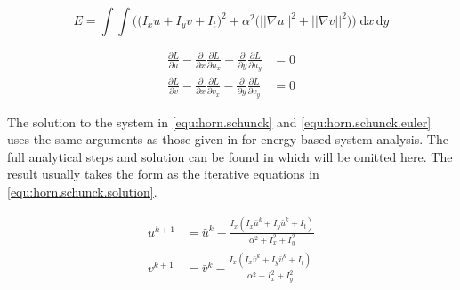 \begin{equation}\label{equ:horn.schunck}
	E = \int \int \Big ( \big (I_x u + I_y v + I_t\big )^2 + \alpha^2\big (||\nabla u||^2 + ||\nabla v||^2\big ) \Big )\; \mathrm{d}x\,\mathrm{d}y
\end{equation}

\begin{equation}\label{equ:horn.schunck.euler}
	\begin{split}
		\frac{\partial L}{\partial u} - \frac{\partial}{\partial x}\frac{\partial L}{\partial u_x} - \frac{\partial}{\partial y}\frac{\partial L}{\partial u_y} &= 0 \\
		\frac{\partial L}{\partial v} - \frac{\partial}{\partial x}\frac{\partial L}{\partial v_x} - \frac{\partial}{\partial y}\frac{\partial L}{\partial v_y} &= 0
	\end{split}
\end{equation}

The solution to the system in \eqref{equ:horn.schunck} and \eqref{equ:horn.schunck.euler} uses the same arguments as those given in \citet{khalil01} for energy based system analysis.
The full analytical steps and solution can be found in \citet{horn80} which will be omitted here. The result usually takes the form as the iterative equations in \eqref{equ:horn.schunck.solution}.

\begin{equation}\label{equ:horn.schunck.solution}
	\begin{split}
		u^{k + 1} &= \bar{u}^k - \frac{I_x\left(I_x\bar{u}^k + I_y\bar{u}^k + I_t\right)}{\alpha^2 + I_x^2 + I_y^2} \\
		v^{k + 1} &= \bar{v}^k - \frac{I_x\left(I_x\bar{v}^k + I_y\bar{v}^k + I_t\right)}{\alpha^2 + I_x^2 + I_y^2}
	\end{split}
\end{equation}

